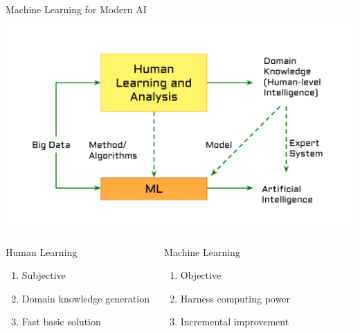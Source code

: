 \documentclass[aspectratio=169,xcolor=dvipsnames,svgnames,x11names,fleqn]{beamer}
\begin{document}
\begin{frame}{Machine Learning for Modern AI}
     \begin{center}
    \includegraphics[width=0.42\linewidth,trim=1cm 1.5cm 1cm 1.5cm,clip]{figures/ModernAI.pdf}
  \end{center}
  \begin{columns}
    \begin{redblock}{Human Learning}
        \begin{enumerate}
            \item Subjective
            \item Domain knowledge generation
            \item Fast basic solution
        \end{enumerate}
    \end{redblock}

    \begin{redblock}{Machine Learning}
      \begin{enumerate}
            \item Objective
            \item Harness computing power
            \item Incremental improvement
        \end{enumerate}
    \end{redblock}
\end{columns}
\end{frame}
\end{document}
